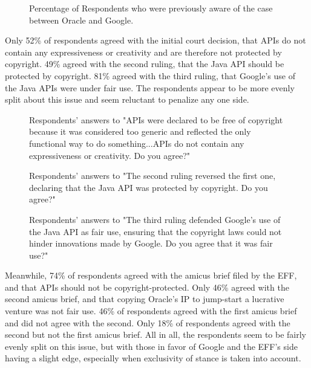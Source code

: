 \documentclass[prodmode,cs196]{acmlarge}
\begin{document}
\begin{figure}[h]
	\caption{Percentage of Respondents who were previously aware of the case between Oracle and Google.}
\end{figure}

Only 52\% of respondents agreed with the initial court decision, that APIs do not contain any expressiveness or creativity and are therefore not protected by copyright. 49\% agreed with the second ruling, that the Java API should be protected by copyright. 81\% agreed with the third ruling, that Google's use of the Java APIs were under fair use. The respondents appear to be more evenly split about this issue and seem reluctant to penalize any one side.

\begin{figure}[h]
	\caption{Respondents' answers to "APIs were declared to be free of copyright because it was considered too generic and reflected the only functional way to do something...APIs do not contain any expressiveness or creativity. Do you agree?"}
\end{figure}

\begin{figure}[h]
	\caption{Respondents' answers to "The second ruling reversed the first one, declaring that the Java API was protected by copyright. Do you agree?"}
\end{figure}

\begin{figure}[H]
	\caption{Respondents' answers to "The third ruling defended Google’s use of the Java API as fair use, ensuring that the copyright laws could not hinder innovations made by Google. Do you agree that it was fair use?"}
\end{figure}

Meanwhile, 74\% of respondents agreed with the amicus brief filed by the EFF, and that APIs should not be copyright-protected. Only 46\% agreed with the second amicus brief, and that copying Oracle's IP to jump-start a lucrative venture was not fair use. 46\% of respondents agreed with the first amicus brief and did not agree with the second. Only 18\% of respondents agreed with the second but not the first amicus brief. All in all, the respondents seem to be fairly evenly split on this issue, but with those in favor of Google and the EFF's side having a slight edge, especially when exclusivity of stance is taken into account.
\end{document}
